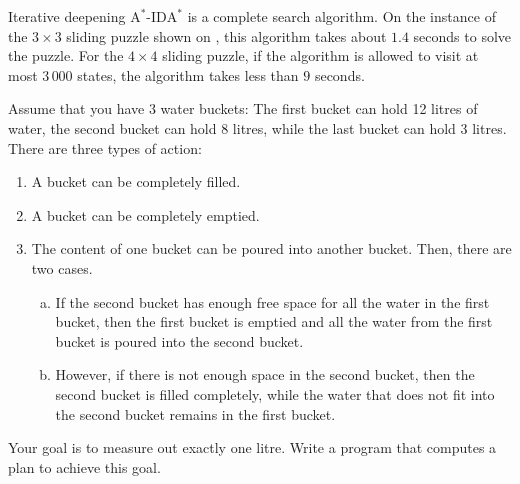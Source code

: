 Iterative deepening $\mathrm{A}^*$-$\mathrm{IDA}^*$ is a complete search algorithm.
On the instance of the $3 \times 3$ sliding puzzle shown on , this
algorithm takes about $1.4$ seconds to solve the puzzle.  For the $4 \times 4$ sliding puzzle, if the algorithm
is allowed to visit at most $3\,000$ states, the algorithm takes less than $9$ seconds.


\exercise
Assume that you have 3 water buckets:  The first bucket can hold 12 litres of water, the second bucket can hold 8 litres,
while the last bucket can hold 3 litres.  There are three types of action:
\begin{enumerate}
\item A bucket can be completely filled.
\item A bucket can be completely emptied.
\item The content of one bucket can be poured into another bucket.  Then, there are two cases.
      \begin{enumerate}[(a)]
      \item If the second bucket has enough free space for all the water in the first bucket,
            then the first bucket is emptied and all the water from the first bucket is poured
            into the second bucket.
      \item However, if there is not enough space in the second bucket, then the second bucket is filled
            completely, while the water that does not fit into the second bucket remains in the first bucket.
      \end{enumerate}
\end{enumerate}
Your goal is to measure out exactly one litre.  Write a program that computes a plan to achieve this goal.
\eox
\pagebreak


